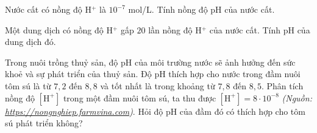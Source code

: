 \begin{bt}%
	\begin{listEX}[1]
		\item[a)] Nước cất có nồng độ  H$^+ $ là $ 10^{-7} $ mol/L. Tính nồng độ pH của nước cất.
		\item[b)] Một dung dịch có nồng độ  H$^+ $ gấp $ 20 $ lần nồng độ  H$^+ $ của nước cất. Tính pH của dung dịch đó. 
	\end{listEX}
\end{bt}

\begin{bt}%
 
	Trong nuôi trồng thuỷ sản, độ $\mathrm{pH}$ của môi trường nước sẽ ảnh hưởng đến sức khoẻ và sự phát triển của thuỷ sản. Độ $\mathrm{pH}$ thích hợp cho nước trong đầm nuôi tôm sú là từ $7{,}2$ đến $8{,}8$ và tốt nhất là trong khoảng từ $7{,}8$ đến $8{,}5$. Phân tích nồng độ $\left[\mathrm{H}^{+}\right]$ trong một đầm nuôi tôm sú, ta thu được $\left[\mathrm{H}^{+}\right]=8 \cdot 10^{-8}$ \textit{(Nguồn: \href{https://nongnghiep.farmvina.com}{https://nongnghiep.farmvina.com})}. Hỏi độ pH của đầm đó có thích hợp cho tôm sú phát triển không?
\end{bt}
